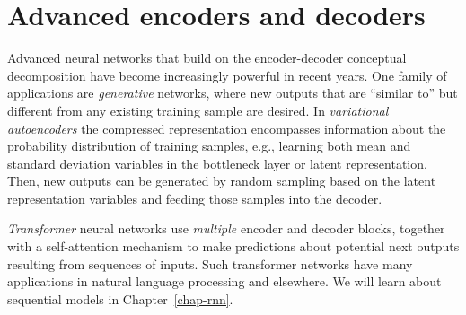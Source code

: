 \section{Advanced encoders and decoders}

Advanced neural networks that build on the encoder-decoder conceptual
decomposition have become increasingly powerful in recent years. One
family of applications are {\em generative}
networks, where new outputs that are ``similar to'' but different from
any existing training sample are desired. In {\em variational
    autoencoders} the compressed
representation encompasses information about the probability
distribution of training samples, e.g., learning both mean and
standard deviation variables in the bottleneck layer or latent
representation. Then, new outputs can be generated by random sampling
based on the latent representation variables and feeding those samples
into the decoder.

  {\em Transformer} neural networks use {\em multiple} encoder and
decoder blocks, together with a self-attention mechanism to make predictions
about potential next outputs resulting from sequences of inputs. Such
transformer networks have many applications in natural language
processing and elsewhere. We will learn about sequential models in
Chapter~\ref{chap-rnn}.

